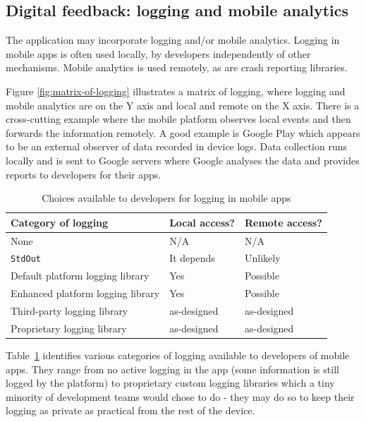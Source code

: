 \subsection{Digital feedback: logging and mobile analytics}
The application may incorporate logging and/or mobile analytics. Logging in mobile apps is often used locally, by developers independently of other mechanisms. Mobile analytics is used remotely, as are crash reporting libraries. 



Figure \ref{fig:matrix-of-logging} illustrates a matrix of logging, where logging and mobile analytics are on the Y axis and local and remote on the X axis. There is a cross-cutting example where the mobile platform observes local events and then forwards the information remotely. A good example is Google Play which appears to be an external observer of data recorded in device logs. Data collection runs locally and is sent to Google servers where Google analyses the data and provides reports to developers for their apps. %

\begin{table}[h]
    \centering
    \begin{tabular}{lll}
         Category of logging &Local access?  &Remote access? \\
         \hline
         None            &N/A  &N/A \\
         \texttt{StdOut} &It depends &Unlikely \\
         Default platform logging library &Yes &Possible \\
         Enhanced platform logging library &Yes &Possible \\
         Third-party logging library &as-designed &as-designed \\
         Proprietary logging library &as-designed &as-designed \\
         
    \end{tabular}
    \caption{Choices available to developers for logging in mobile apps}
    \label{tab:logging-choices-for-devs}
\end{table}

Table~\ref{tab:logging-choices-for-devs} identifies various categories of logging available to developers of mobile apps. They range from no active logging in the app (some information is still logged by the platform) to proprietary custom logging libraries which a tiny minority of development teams would chose to do - they may do so to keep their logging as private as practical from the rest of the device.

